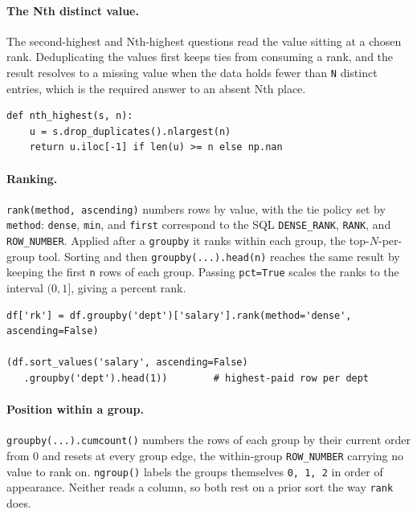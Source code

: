 \paragraph{The Nth distinct value.} The second-highest and Nth-highest questions read the value sitting at a chosen rank. Deduplicating the values first keeps ties from consuming a rank, and the result resolves to a missing value when the data holds fewer than \texttt{N} distinct entries, which is the required answer to an absent Nth place.

\begin{lstlisting}[style=python, caption={Nth-highest distinct value, NaN when it does not exist}]
def nth_highest(s, n):
    u = s.drop_duplicates().nlargest(n)
    return u.iloc[-1] if len(u) >= n else np.nan
\end{lstlisting}

\vspace{-1ex}

\paragraph{Ranking.} \texttt{rank(method, ascending)} numbers rows by value, with the tie policy set by \texttt{method}: \texttt{dense}, \texttt{min}, and \texttt{first} correspond to the SQL \texttt{DENSE\_RANK}, \texttt{RANK}, and \texttt{ROW\_NUMBER}. Applied after a \texttt{groupby} it ranks within each group, the top-$N$-per-group tool. Sorting and then \texttt{groupby(...).head(n)} reaches the same result by keeping the first \texttt{n} rows of each group. Passing \texttt{pct=True} scales the ranks to the interval $(0, 1]$, giving a percent rank.

\begin{lstlisting}[style=python, caption={Rank within a group, and top-N per group by slicing}]
df['rk'] = df.groupby('dept')['salary'].rank(method='dense', ascending=False)

(df.sort_values('salary', ascending=False)
   .groupby('dept').head(1))        # highest-paid row per dept
\end{lstlisting}

\vspace{-1ex}

\paragraph{Position within a group.} \texttt{groupby(...).cumcount()} numbers the rows of each group by their current order from 0 and resets at every group edge, the within-group \texttt{ROW\_NUMBER} carrying no value to rank on. \texttt{ngroup()} labels the groups themselves \texttt{0, 1, 2} in order of appearance. Neither reads a column, so both rest on a prior sort the way \texttt{rank} does.

